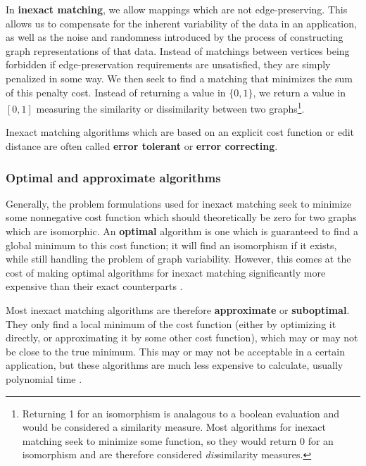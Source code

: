 \documentclass[12pt]{thesis}
\theoremstyle{plain}
\theoremstyle{definition}
\theoremstyle{remark}
\begin{document}
In \textbf{inexact matching}, we allow mappings which are not edge-preserving. This allows us to compensate for the inherent variability of the data in an application, as well as the noise and randomness introduced by the process of constructing graph representations of that data. Instead of matchings between vertices being forbidden if edge-preservation requirements are unsatisfied, they are simply penalized in some way. We then seek to find a matching that minimizes the sum of this penalty cost. Instead of returning a value in $\{0,1\}$, we return a value in $[0,1]$ measuring the similarity or dissimilarity between two graphs\footnote{Returning 1 for an isomorphism is analagous to a boolean evaluation and would be considered a similarity measure. Most algorithms for inexact matching seek to minimize some function, so they would return 0 for an isomorphism and are therefore considered \textit{dis}similarity measures.}.

Inexact matching algorithms which are based on an explicit cost function or edit distance are often called \textbf{error tolerant} or \textbf{error correcting}. 

\subsubsection{Optimal and approximate algorithms}

Generally, the problem formulations used for inexact matching seek to minimize some nonnegative cost function which should theoretically be zero for two graphs which are isomorphic. An \textbf{optimal} algorithm is one which is guaranteed to find a global minimum to this cost function; it will find an isomorphism if it exists, while still handling the problem of graph variability. However, this comes at the cost of making optimal algorithms for inexact matching significantly more expensive than their exact counterparts \cite{Conte_2004}.

Most inexact matching algorithms are therefore \textbf{approximate} or \textbf{suboptimal}. They only find a local minimum of the cost function (either by optimizing it directly, or approximating it by some other cost function), which may or may not be close to the true minimum. This may or may not be acceptable in a certain application, but these algorithms are much less expensive to calculate, usually polynomial time  \cite{Conte_2004}.
\end{document}
